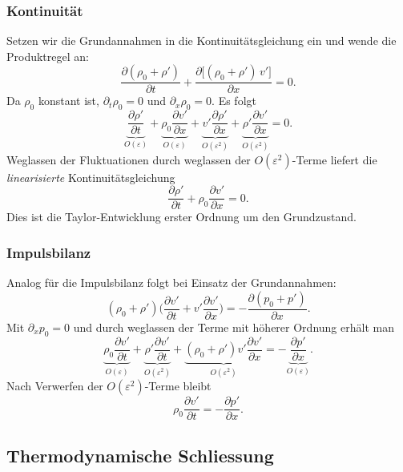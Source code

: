 \subsubsection{Kontinuität}
Setzen wir die Grundannahmen in die Kontinuitätsgleichung ein und
%
wende die Produktregel an:
\[
    \frac{\partial(\rho_0+\rho')}{\partial t}
    +\frac{\partial\big[(\rho_0+\rho')\,v'\big]}{\partial x}=0.
\]
Da \(\rho_0\) konstant ist, \(\partial_t\rho_0=0\) und \(\partial_x\rho_0=0\).
Es folgt
\[
    \underbrace{\frac{\partial \rho'}{\partial t}}_{\displaystyle O(\varepsilon)}
    +\underbrace{\rho_0\frac{\partial v'}{\partial x}}_{\displaystyle O(\varepsilon)}
    +\underbrace{v'\frac{\partial \rho'}{\partial x}}_{\displaystyle O(\varepsilon^2)}
    +\underbrace{\rho'\frac{\partial v'}{\partial x}}_{\displaystyle O(\varepsilon^2)}=0.
\]
Weglassen der Fluktuationen durch weglassen der \(O(\varepsilon^2)\)-Terme
liefert die \emph{linearisierte} Kontinuitätsgleichung
%
\begin{equation}
    \frac{\partial \rho'}{\partial t}+\rho_0\frac{\partial v'}{\partial x}=0.
    \label{eq:lin-cont}
\end{equation}
Dies ist die Taylor-Entwicklung erster Ordnung um den Grundzustand.

\subsubsection{Impulsbilanz}
Analog für die Impulsbilanz folgt bei Einsatz der Grundannahmen:
\[
    (\rho_0+\rho')\biggl(\frac{\partial v'}{\partial t}+v'\frac{\partial v'}{\partial x}\biggr)
    =-\frac{\partial (p_0+p')}{\partial x}.
\]
Mit \(\partial_x p_0=0\) und durch weglassen der Terme mit höherer Ordnung erhält man
\[
    \underbrace{\rho_0\frac{\partial v'}{\partial t}}_{\displaystyle O(\varepsilon)}
    +\underbrace{\rho'\frac{\partial v'}{\partial t}}_{\displaystyle O(\varepsilon^2)}
    +\underbrace{(\rho_0+\rho')v'\frac{\partial v'}{\partial x}}_{\displaystyle O(\varepsilon^2)}
    =-\underbrace{\frac{\partial p'}{\partial x}}_{\displaystyle O(\varepsilon)}.
\]
Nach Verwerfen der \(O(\varepsilon^2)\)-Terme bleibt
\begin{equation}
    \rho_0\frac{\partial v'}{\partial t}=-\frac{\partial p'}{\partial x}.
    \label{eq:lin-mom}
\end{equation}

\subsection{Thermodynamische Schliessung}

